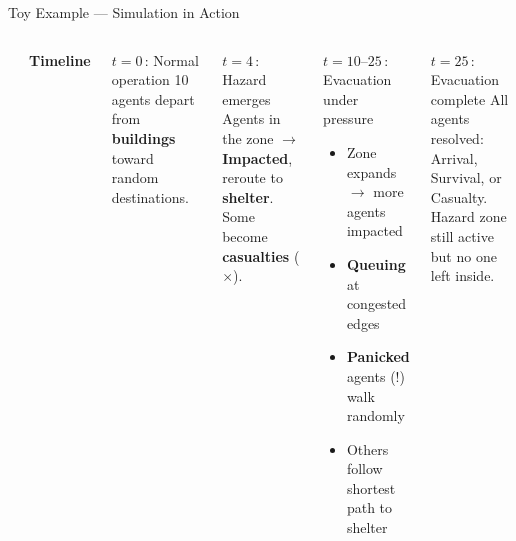 \documentclass[aspectratio=169, xcolor=table]{beamer}
\begin{document}
\begin{frame}[t,shrink=8]{Toy Example --- Simulation in Action}
\footnotesize

\begin{columns}[T,onlytextwidth]
\vspace{0.1em}
\begin{center}
\end{center}

\vspace{0.1em}

\textbf{Timeline}
\vspace{0.2em}

\begin{block}{\scriptsize $t = 0$\,: Normal operation}
\scriptsize
10 agents depart from \textcolor{statenormal}{\textbf{buildings}} toward random destinations.
\end{block}

\begin{alertblock}{\scriptsize $t = 4$\,: Hazard emerges}
\scriptsize
Agents in the zone $\to$ \textcolor{stateimpacted}{\textbf{Impacted}}, reroute to \textcolor{statesurvival}{\textbf{shelter}}.\\
Some become \textcolor{statecasualty}{\textbf{casualties}} ($\times$).
\end{alertblock}

\begin{block}{\scriptsize $t = 10\text{--}25$\,: Evacuation under pressure}
\scriptsize
\begin{itemize}\itemsep0.1em
  \item Zone expands $\to$ more agents impacted
  \item \textcolor{statequeuing}{\textbf{Queuing}} at congested edges
  \item \textcolor{highlightred}{\textbf{Panicked}} agents (!) walk randomly
  \item Others follow shortest path to shelter
\end{itemize}
\end{block}

\begin{block}{\scriptsize $t = 25$\,: Evacuation complete}
\scriptsize
All agents resolved: Arrival, Survival, or Casualty.\\
Hazard zone still active but no one left inside.
\end{block}

\end{columns}
\end{frame}
\end{document}
